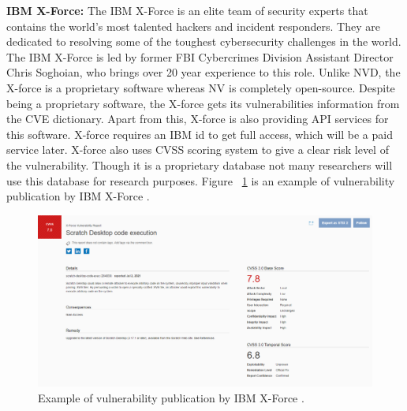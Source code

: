 {\bf IBM X-Force:} The IBM X-Force is an elite team of security experts that contains the world's most talented hackers and incident responders. They are dedicated to resolving some of the toughest cybersecurity challenges in the world. The IBM X-Force is led by former FBI Cybercrimes Division Assistant Director Chris Soghoian, who brings over 20 year experience to this role. Unlike \acs{NVD}, the X-force is a proprietary software whereas NV is completely open-source. Despite being a proprietary software, the X-force gets its vulnerabilities information from the \acs{CVE} dictionary. Apart from this, X-force is also providing API services for this software. X-force requires an IBM id to get full access, which will be a paid service later. X-force also uses \acs{CVSS} scoring system to give a clear risk level of the vulnerability. Though it is a proprietary database not many researchers will use this database for research purposes. Figure ~\ref{fig:ibm} is an example of vulnerability publication by IBM X-Force \cite{IbmXforce}.
\newpage
\begin{figure}[h!]
	\includegraphics[width=15cm]{includes/ibm.png}
	\centering
	\caption{Example of vulnerability publication by IBM X-Force \cite{IbmXforce}.}
	\label{fig:ibm}
\end{figure}

